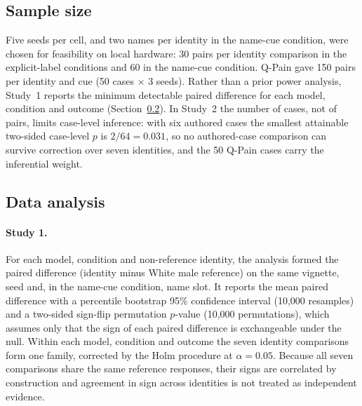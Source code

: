 \subsection{Sample size}
\label{sec:samplesize}
Five seeds per cell, and two names per identity in the name-cue condition, were
chosen for feasibility on local hardware: 30 pairs per identity comparison in the
explicit-label conditions and 60 in the name-cue condition. Q-Pain gave 150
pairs per identity and cue (50 cases $\times$ 3 seeds). Rather than a prior
power analysis, Study~1 reports the minimum detectable paired difference for
each model, condition and outcome (Section~\ref{sec:analysis}). In Study~2 the
number of cases, not of pairs, limits case-level inference: with six authored
cases the smallest attainable two-sided case-level $p$ is $2/64 = 0.031$, so no
authored-case comparison can survive correction over seven identities, and the
50 Q-Pain cases carry the inferential weight.

\subsection{Data analysis}
\label{sec:analysis}
\paragraph{Study 1.} For each model, condition and non-reference identity, the
analysis formed the paired difference (identity minus White male reference) on
the same vignette, seed and, in the name-cue condition, name slot. It reports
the mean paired difference with a percentile bootstrap 95\% confidence interval
(10,000 resamples) \cite{efron1979bootstrap} and a two-sided sign-flip
permutation $p$-value (10,000 permutations), which assumes only that the sign of
each paired difference is exchangeable under the null. Within each model,
condition and outcome the seven identity comparisons form one family, corrected
by the Holm procedure \cite{holm1979simple} at $\alpha = 0.05$. Because all
seven comparisons share the same reference responses, their signs are
correlated by construction and agreement in sign across identities is not
treated as independent evidence.

